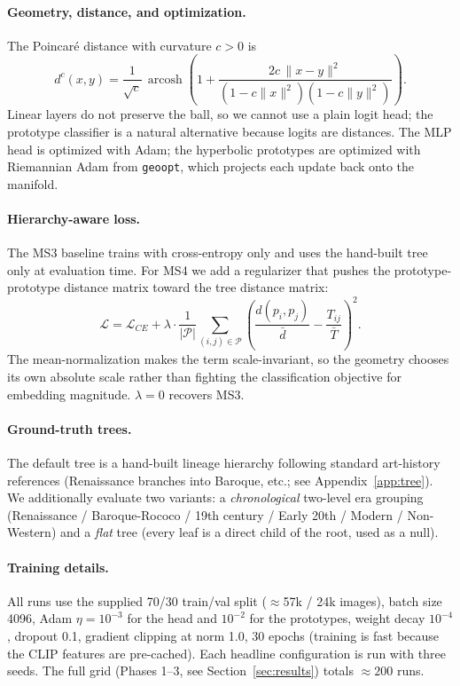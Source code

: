 \documentclass[11pt]{article}
\begin{document}
\paragraph{Geometry, distance, and optimization.} The Poincar\'e distance
with curvature $c > 0$ is
\[
  d^c(x, y) = \frac{1}{\sqrt{c}}\,\operatorname{arcosh}\!\left(
    1 + \frac{2c\,\|x-y\|^2}{(1-c\|x\|^2)(1-c\|y\|^2)}
  \right).
\]
Linear layers do not preserve the ball, so we cannot use a plain logit head;
the prototype classifier is a natural alternative because logits are
distances. The MLP head is optimized with Adam; the hyperbolic prototypes
are optimized with Riemannian Adam from \texttt{geoopt}, which projects each
update back onto the manifold.

\paragraph{Hierarchy-aware loss.} The MS3 baseline trains with cross-entropy
only and uses the hand-built tree only at evaluation time. For MS4 we add a
regularizer that pushes the prototype-prototype distance matrix toward the
tree distance matrix:
\[
  \mathcal{L} = \mathcal{L}_{CE} + \lambda \cdot \frac{1}{|\mathcal{P}|}
    \sum_{(i,j) \in \mathcal{P}} \!\left(
      \frac{d(p_i, p_j)}{\bar{d}} - \frac{T_{ij}}{\bar{T}}
    \right)^{\!\!2}.
\]
The mean-normalization makes the term scale-invariant, so the geometry
chooses its own absolute scale rather than fighting the classification
objective for embedding magnitude. $\lambda = 0$ recovers MS3.

\paragraph{Ground-truth trees.} The default tree is a hand-built lineage
hierarchy following standard art-history references (Renaissance branches
into Baroque, etc.; see Appendix~\ref{app:tree}). We additionally evaluate
two variants: a \emph{chronological} two-level era grouping
(Renaissance / Baroque-Rococo / 19th century / Early 20th / Modern /
Non-Western) and a \emph{flat} tree (every leaf is a direct child of the
root, used as a null).

\paragraph{Training details.} All runs use the supplied 70/30 train/val
split ($\approx$57k / 24k images), batch size 4096, Adam $\eta=10^{-3}$ for
the head and $10^{-2}$ for the prototypes, weight decay $10^{-4}$, dropout
0.1, gradient clipping at norm 1.0, 30 epochs (training is fast because the
CLIP features are pre-cached). Each headline configuration is run with three
seeds. The full grid (Phases 1–3, see Section~\ref{sec:results}) totals
$\approx 200$ runs.
\end{document}
